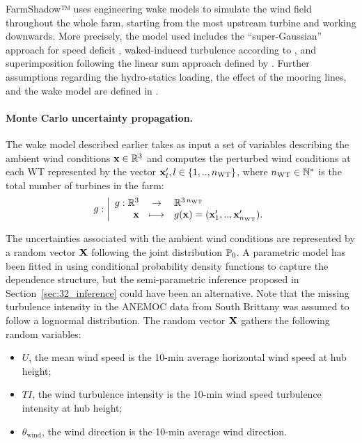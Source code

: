 FarmShadow™ uses engineering wake models to simulate the wind field throughout the whole farm, starting from the most upstream turbine and working downwards. 
More precisely, the model used includes the ``super-Gaussian'' approach for speed deficit \citep{blondel_2020}, waked-induced turbulence according to \citet{quian_2018}, and superimposition following the linear sum approach defined by \citet{zong_2020}.    
Further assumptions regarding the hydro-statics loading, the effect of the mooring lines, and the wake model are defined in \citet{lovera_fekhari_2023}.


\paragraph{Monte Carlo uncertainty propagation.}

The wake model described earlier takes as input a set of variables describing the ambient wind conditions $\bx \in \mathbb{R}^3$ and computes the perturbed wind conditions at each WT represented by the vector $\bx _l', l \in \left\{1,..,n_{\mathrm{WT}}\right\}$, where $n_{\mathrm{WT}} \in \N^*$ is the total number of turbines in the farm:
\begin{equation}
    g : \bigg|
        \begin{array}{rcl}
            g:\mathbb{R}^3 & \rightarrow & \mathbb{R}^{3 \, n_{\mathrm{WT}}} \\
            \bx &\longmapsto & g(\bx) = (\bx_1',..,\bx_{n_{\mathrm{WT}}}').
        \end{array}
    \end{equation}

The uncertainties associated with the ambient wind conditions are represented by a random vector $\bX$ following the joint distribution $\P_0$. 
A parametric model has been fitted in \cite{vanem_fekhari_2023} using conditional probability density functions to capture the dependence structure, 
but the semi-parametric inference proposed in Section~\ref{sec:32_inference} could have been an alternative. 
Note that the missing turbulence intensity in the ANEMOC data from South Brittany was assumed to follow a lognormal distribution.   
The random vector $\bX$ gathers the following random variables:
\begin{itemize}
    \item $U$, the mean wind speed is the 10-min average horizontal wind speed at hub height;
    \item $TI$, the wind turbulence intensity is the 10-min wind speed turbulence intensity at hub height;
    \item $\theta_{\mathrm{wind}}$, the wind direction is the 10-min average wind direction.
\end{itemize}

